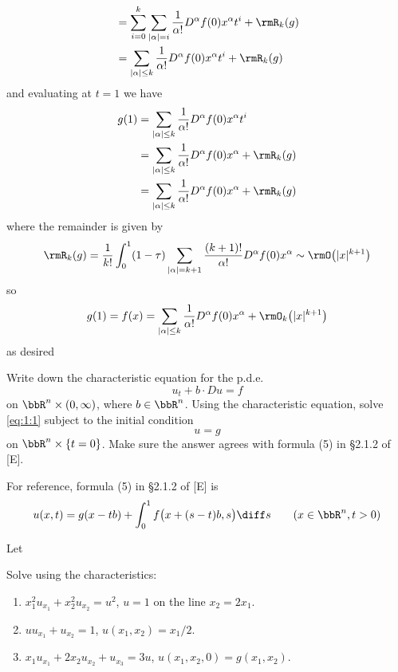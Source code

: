 \begin{solution}
\begin{align*}
    &=\sum_{i=0}^k\sum_{|\alpha|=i}\frac{1}{\alpha!}D^\alpha f(0)x^\alpha t^i+\rmR_k(g)\\
    &=\sum_{|\alpha|\leq k}\frac{1}{\alpha!}D^\alpha f(0)x^\alpha t^i+\rmR_k(g)
  \end{align*}
  and evaluating at \(t=1\) we have
  \begin{align*}
    g(1)
    &=\sum_{|\alpha|\leq k}\frac{1}{\alpha!}D^\alpha f(0)x^\alpha t^i\\
    &=\sum_{|\alpha|\leq k}\frac{1}{\alpha!}D^\alpha
      f(0)x^\alpha+\rmR_k(g)\\
    &=\sum_{|\alpha|\leq k}\frac{1}{\alpha!}D^\alpha
      f(0)x^\alpha+\rmR_k(g)
  \end{align*}
  where the remainder is given by
  \[
    \rmR_k(g)=\frac{1}{k!}\int_0^1(1-\tau)
    \sum_{|\alpha|=k+1}\frac{(k+1)!}{\alpha!}D^\alpha f(0)x^\alpha\sim
    \rmO\bigl(|x|^{k+1}\bigr)
  \]
  so
  \[
    g(1)=f(x)=\sum_{|\alpha|\leq k}\frac{1}{\alpha!}D^\alpha
    f(0)x^\alpha+\rmO_k\bigl(|x|^{k+1}\bigr)
  \]
  as desired
\end{solution}
\newpage

\begin{problem}
  Write down the characteristic equation for the p.d.e.\@
  \[
    \label{eq:1:1}
    \tag{\(*\)}
    u_t+b\cdot Du=f
  \]
  on \(\bbR^n\times(0,\infty)\), where \(b\in\bbR^n\). Using the
  characteristic equation, solve \eqref{eq:1:1} subject to the initial
  condition
  \[
    u=g
  \]
  on \(\bbR^n\times\{t=0\}\). Make sure the answer agrees with formula (5)
  in \S 2.1.2 of [E].
\end{problem}
\begin{solution}
  For reference, formula (5) in \S 2.1.2 of [E] is
  \[
    u(x,t)=g(x -tb)+\int_0^1 f\bigl(x+(s-t)b,s\bigr)\diff s
    \qquad (x\in\bbR^n,t>0)
  \]

  Let
\end{solution}
\newpage

\begin{problem}
  Solve using the characteristics:
  \begin{enumerate}[label=(\alph*)]
  \item \(x_1^2u_{x_1}+x_2^2u_{x_2}=u^2\), \(u=1\) on the line
    \(x_2=2x_1\).
  \item \(uu_{x_1}+u_{x_2}=1\), \(u(x_1,x_2)=x_1/2\).
  \item \(x_1u_{x_1}+2x_2u_{x_2}+u_{x_3}=3u\),
    \(u(x_1,x_2,0)=g(x_1,x_2)\).
  \end{enumerate}
\end{problem}
\begin{solution}

\end{solution}
\newpage

